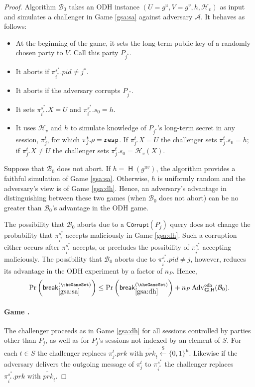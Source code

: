 \documentclass[USenglish,oneside,twocolumn]{article}
\theoremstyle{dgthm}
\theoremstyle{dgdef}
\newcounter{GameSet}
\newcounter{GameNum}[GameSet]
\newcommand{\Protocol}[1]{\operatorname{\mathsf{#1}}}
\newcommand{\samples}{\xleftarrow{\$}}
\newcommand{\AlgorithmName}[1]{\operatorname{\mathsf{#1}}}
\newcommand{\Hash}{\AlgorithmName{H}}
\newcommand{\p}[2]{\pi_{#1}^{#2}}
\newcommand{\Oracle}[1]{\mathcal #1}
\newcommand{\Token}[1]{\textnormal{\tt{#1}}}
\newcommand{\resp}{\Token{resp}}
\newcommand{\AdvInt}[1]{\mathsf{#1}}
\newcommand{\Corrupt}{\AdvInt{Corrupt}}
\newcommand{\LGame}[1]{\refstepcounter{GameNum}\label{#1}\paragraph*{Game \theGameNum.~}}
\newcommand{\brk}[1]{\mathsf{break}_{#1}^{(\theGameSet)}}
\newcommand{\Prb}[1]{\mathrm{Pr}\left(\brk{#1}\right)}
\newcommand{\Experiment}[1]{\operatorname{\tt{#1}}}
\newcommand{\Algorithm}[1]{\mathcal #1}
\newcommand{\AdvName}[2]{\operatorname{\mathrm{Adv}_{\Protocol{#1}}^{\Experiment{#2}}}}
\newcommand{\Adv}[3]{\AdvName{#1}{#2}(\Algorithm{#3})}
\newcommand{\AdvOdh}[1]{\Adv{\mathbf{G}, \Hash}{odh}{#1}}
\begin{document}
\begin{proof}
  Algorithm $\Oracle{B}_0$ takes an ODH instance $(U = g^u, V = g^v, h, \Oracle{H}_v)$
  as input and simulates a challenger in Game \ref{gsa:sa} against adversary
  $\Oracle{A}$. It behaves as follows:
  \begin{itemize}
    \item At the beginning of the game, it sets the long-term public
      key of a randomly chosen party to $V$. Call this party $P_{j^*}$.
    \item It aborts if $\p{i^*}{s^*}.pid \ne j^*$.
    \item It aborts if the adversary corrupts $P_{j^*}$.
    \item It sets $\p{i^*}{s^*}.X = U$ and $\p{i^*}{s^*}.s_0 = h$.
    \item It uses $\Oracle{H}_v$ and $h$ to simulate knowledge of $P_{j^*}$'s long-term secret
      in any session, $\p{j}{t}$, for which $\p{j}{t}.\rho = \resp$. If $\p{j}{t}.X = U$ the challenger
      sets $\p{j}{t}.s_0 = h$; if $\p{j}{t}.X \ne U$ the challenger sets $\p{j}{t}.s_0 = \Oracle{H}_v(X)$.
  \end{itemize}
  Suppose that $\Oracle{B}_0$ does not abort.
  If $h = \Hash(g^{uv})$, the algorithm provides a faithful simulation of Game \ref{gsa:sa}.
  Otherwise, $h$ is uniformly random and the adversary's view is of Game \ref{gsa:dh}. Hence, an
  adversary's advantage in distinguishing between these two games (when $\Oracle{B}_0$
  does not abort) can be no greater than $\Oracle{B}_0$'s advantage in the ODH game.

  The possibility that $\Oracle{B}_0$ aborts due to a $\Corrupt(P_j)$ query does
  not change the probability that $\p{i^*}{s^*}$ accepts maliciously in Game
  \ref{gsa:dh}. Such a corruption either occurs after $\p{i^*}{s^*}$ accepts,
  or precludes the possibility of $\p{i^*}{s^*}$ accepting maliciously.
  The possibility that $\Oracle{B}_0$ aborts due to $\p{i^*}{s^*}.pid \ne j$,
  however, reduces its advantage in the ODH experiment by a factor of $n_P$.
  Hence,
  \begin{equation} \label{eq:gsa:dh}
  \Prb{\ref{gsa:sa}} \le \Prb{\ref{gsa:dh}} + n_P\AdvOdh{B_0}.
  \end{equation}

  \LGame{gsa:xtr} The challenger proceeds as in Game \ref{gsa:dh} for all
  sessions controlled by parties other than $P_j$, as well as for $P_j$'s
  sessions not indexed by an element of $S$. For each $t \in S$ the challenger
  replaces $\p{j}{t}.prk$ with
  $\widetilde{prk}_t \samples \{0,1\}^\mu$.  Likewise if the adversary delivers the
  outgoing message of $\p{j}{t}$ to $\p{i^*}{s^*}$ the challenger replaces
  $\p{i^*}{s^*}.prk$ with $\widetilde{prk}_t$.


\end{proof}
\end{document}
